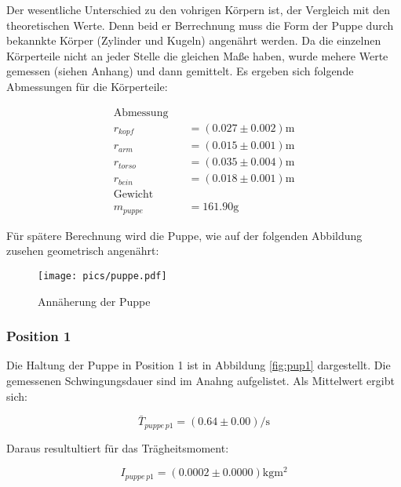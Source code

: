 Der wesentliche Unterschied zu den vohrigen Körpern ist, der Vergleich mit den theoretischen Werte. Denn beid er Berrechnung muss die Form der Puppe 
durch bekannkte Körper (Zylinder und Kugeln) angenährt werden.
Da die einzelnen Körperteile nicht an jeder Stelle die gleichen Maße haben,
wurde mehere Werte gemessen (siehen Anhang) und dann gemittelt.
Es ergeben sich folgende Abmessungen für die Körperteile:

\begin{align*}
\text{Abmessung} \quad &\\
r_{kopf}&=\left(\num{0.027}\pm\num{0.002}\right)\si{\meter}\\
r_{arm}&=\left(\num{0.015}\pm\num{0.001}\right)\si{\meter}\\
r_{torso}&=\left(\num{0.035}\pm\num{0.004}\right)\si{\meter}\\
r_{bein}&=\left(\num{0.018}\pm\num{0.001}\right)\si{\meter}\\
\text{Gewicht} \quad &\\
m_{puppe}&=\num{161.90}\si{\gram}
\end{align*}

Für spätere Berechnung wird die Puppe, wie auf der folgenden Abbildung zusehen geometrisch angenährt:


\begin{figure}
  \centering
  \texttt{[image: pics/puppe.pdf]}
  \caption{Annäherung der Puppe}
  \label{fig:approx_puppe}
\end{figure}

\subsubsection{Position 1}

Die Haltung der Puppe in Position 1 ist in Abbildung \ref{fig:pup1} dargestellt.
Die gemessenen Schwingungsdauer sind im Anahng aufgelistet.
Als Mittelwert ergibt sich:

\begin{equation*}
\bar{T}_{puppe\, p1}=\left(\num{0.64}\pm\num{0.00}\right) \si{\per\second}
\end{equation*}

Daraus resultultiert für das Trägheitsmoment:

\begin{equation}
\label{eq:traeg_puppe_p1}
I_{puppe \,p1}= \left(\num{0.0002}\pm\num{0.0000}\right)\si{\kilogram\meter\squared}
\end{equation}

